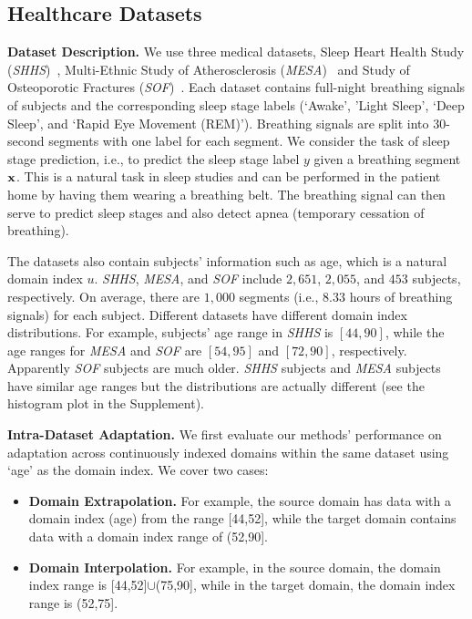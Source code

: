 \documentclass{article}
\newenvironment{Itemize}{\begin{itemize}\setlength{\itemsep}{0pt}\setlength{\topsep}{0pt}\setlength{\partopsep}{0pt}\setlength{\parskip}{0pt}}{\end{itemize}}
\begin{document}
\subsection{Healthcare Datasets}
\textbf{Dataset Description.}
We use three medical datasets, Sleep Heart Health Study (\emph{SHHS})~\cite{SHHS}, Multi-Ethnic Study of Atherosclerosis (\emph{MESA})~\cite{MESA} and Study of Osteoporotic Fractures (\emph{SOF})~\cite{SOF}. Each dataset contains full-night breathing signals of subjects and the corresponding sleep stage labels (`Awake', 'Light Sleep', `Deep Sleep', and `Rapid Eye Movement (REM)'). Breathing signals are split into 30-second segments with one label for each segment. We consider the task of sleep stage prediction, i.e., to predict the sleep stage label $y$ given a breathing segment ${\bf x}$. This is a natural task in sleep studies and can be performed in the patient home by having them wearing a breathing belt. The breathing signal can then serve to predict sleep stages and also detect apnea (temporary cessation of breathing).

The datasets also contain subjects' information such as age, which is a natural domain index $u$. \emph{SHHS}, \emph{MESA}, and \emph{SOF} include $2{,}651$, $2{,}055$, and $453$ subjects, respectively. On average, there are $1{,}000$ segments (i.e., $8.33$ hours of breathing signals) for each subject. Different datasets have different domain index distributions. For example, subjects' age range in \emph{SHHS} is $[44,90]$, while the age ranges for \emph{MESA} and \emph{SOF} are $[54,95]$ and $[72,90]$, respectively. Apparently \emph{SOF} subjects are much older. \emph{SHHS} subjects and \emph{MESA} subjects have similar age ranges but the distributions are actually different (see the histogram plot in the Supplement).


\textbf{Intra-Dataset Adaptation.} We first evaluate our methods' performance on adaptation across continuously indexed domains within the same dataset using `age' as the domain index. We cover two cases:
\begin{Itemize}
\item \textbf{Domain Extrapolation.} For example, the source domain has data with a domain index (age) from the range [44,52], while the target domain contains data with a domain index range of (52,90]. 
\item \textbf{Domain Interpolation.} For example, in the source domain, the domain index range is [44,52]$\cup$(75,90], while in the target domain, the domain index range is (52,75]. 
\end{Itemize}
\end{document}

